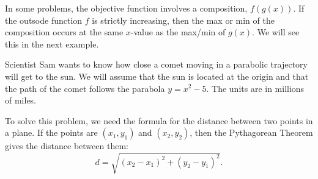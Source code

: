 \documentclass[handout]{ximera}
\begin{document}
In some problems, the objective function involves a composition, $f(g(x))$.  
If the outsode function $f$ is strictly increasing, then the max or min of the composition occurs at the same $x$-value as the max/min of $g(x)$. 
We will see this in the next example.
\begin{example}[example 3]
Scientist Sam wants to know how close a comet moving in a parabolic trajectory will get to the sun. 
We will assume that the sun is located at the origin and that the path of the comet follows the parabola $y = x^2 - 5$. The units 
are in millions of miles.

\begin{center}
\end{center}
To solve this problem, we need the formula for the distance between two points in a plane.
If the points are $(x_1, y_1)$ and $(x_2, y_2)$, then the Pythagorean Theorem gives the distance between them:
\[
d = \sqrt{(x_2 - x_1)^2 + (y_2 - y_1)^2}.
\]
\begin{image}
\end{image}



\end{example}
\end{document}
